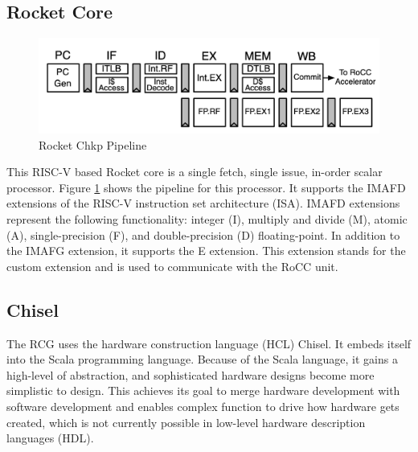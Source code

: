 \documentclass[../main.tex]{subfiles}
\begin{document}
\subsection{Rocket Core}
\begin{figure}
    \centering
    \includegraphics[scale=.35]{pngs/RocketPipeline.png}
    \caption{Rocket Chkp Pipeline\cite{Asanović:EECS-2016-17}}
    \label{fig:RocketCipFlow}
\end{figure}
This RISC-V based Rocket core is a single fetch, single issue, in-order scalar processor. Figure \ref{fig:RocketCipFlow} shows the pipeline for this processor. It supports the IMAFD extensions of the RISC-V instruction set architecture (ISA)\cite{RISC-V-isa}. IMAFD extensions represent the following functionality: integer (I), multiply and divide (M), atomic (A), single-precision (F), and double-precision (D) floating-point\cite{RISC-V-isa}. In addition to the IMAFG extension, it supports the E extension\cite{RISC-V-isa}. This extension stands for the custom extension and is used to communicate with the RoCC unit.

\subsection{Chisel}
The RCG uses the hardware construction language (HCL) Chisel\cite{chisel:book}. It embeds itself into the Scala programming language. Because of the Scala language, it gains a high-level of abstraction, and sophisticated hardware designs become more simplistic to design\cite{chisel:book}. This achieves its goal to merge hardware development with software development and enables complex function to drive how hardware gets created, which is not currently possible in low-level hardware description languages (HDL)\cite{chisel:book}.
\end{document}
